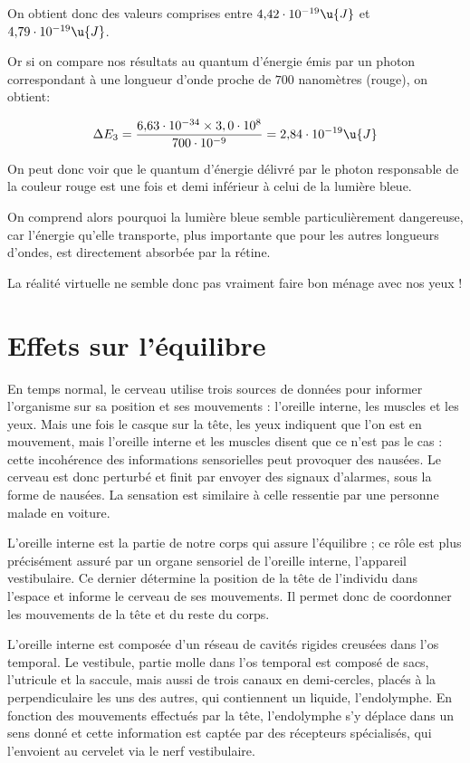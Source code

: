 \documentclass[12pt, a4paper]{report}
\begin{document}
On obtient donc des valeurs comprises entre $ 4{,}42 \cdot 10^{-19}\u{J}$ et $4{,}79 \cdot 10^{-19}\u{J}$.

Or si on compare nos résultats au quantum d'énergie émis par un photon correspondant à une longueur d'onde proche de $700$ nanomètres (rouge), on obtient:
\begin{center}

\[
\Delta E_3 = \dfrac{6{,}63 \cdot 10^{-34} \times 3,0 \cdot 10^8}{700 \cdot 10^{-9}} = 2{,}84 \cdot 10^{-19}\u{J}
\]

\end{center}

On peut donc voir que le quantum d'énergie délivré par le photon responsable de la couleur rouge est une fois et demi inférieur à celui de la lumière bleue.

On comprend alors pourquoi la lumière bleue semble particulièrement dangereuse, car l'énergie qu'elle transporte, plus importante que pour les autres longueurs d'ondes, est directement absorbée par la rétine.

La réalité virtuelle ne semble donc pas vraiment faire bon ménage avec nos yeux !

\section{Effets sur l'équilibre}

En temps normal, le cerveau utilise trois sources de données pour informer l'organisme sur sa position et ses mouvements : l'oreille interne, les muscles et les yeux. Mais une fois le casque sur la tête, les yeux indiquent que l'on est en mouvement, mais l'oreille interne et les muscles disent que ce n'est pas le cas : cette incohérence des informations sensorielles peut provoquer des nausées. Le cerveau est donc perturbé et finit par envoyer des signaux d'alarmes, sous la forme de nausées. La sensation est similaire à celle ressentie par une personne malade en voiture.

L'oreille interne est la partie de notre corps qui assure l'équilibre ; ce rôle est plus précisément assuré par un organe sensoriel de l'oreille interne, l'appareil vestibulaire. Ce dernier détermine la position de la tête de l'individu dans l'espace et informe le cerveau de ses mouvements. Il permet donc de coordonner les mouvements de la tête et du reste du corps.

L'oreille interne est composée d'un réseau de cavités rigides creusées dans l'os temporal. Le vestibule, partie molle dans l'os temporal est composé de sacs, l'utricule et la saccule, mais aussi de trois canaux en demi-cercles, placés à la perpendiculaire les uns des autres, qui contiennent un liquide, l'endolymphe. En fonction des mouvements effectués par la tête, l'endolymphe s'y déplace dans un sens donné et cette information est captée par des récepteurs spécialisés, qui l'envoient au cervelet via le nerf vestibulaire.
\end{document}
